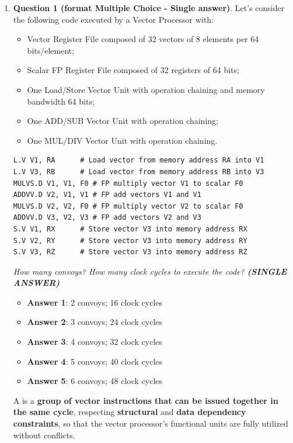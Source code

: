 \begin{enumerate}
    \item \textbf{Question 1 (format Multiple Choice - Single answer)}. Let's consider the following code executed by a Vector Processor with:
    \begin{itemize}
        \item Vector Register File composed of 32 vectors of 8 elements per 64 bits/element;
        \item Scalar FP Register File composed of 32 registers of 64 bits;
        \item One Load/Store Vector Unit with operation chaining and memory bandwidth 64 bits;
        \item One ADD/SUB Vector Unit with operation chaining;
        \item One MUL/DIV Vector Unit with operation chaining.
    \end{itemize}
    \begin{lstlisting}[language=unknown]
L.V V1, RA      # Load vector from memory address RA into V1
L.V V3, RB      # Load vector from memory address RB into V3
MULVS.D V1, V1, F0 # FP multiply vector V1 to scalar F0
ADDVV.D V2, V1, V1 # FP add vectors V1 and V1
MULVS.D V2, V2, F0 # FP multiply vector V2 to scalar F0
ADDVV.D V3, V2, V3 # FP add vectors V2 and V3
S.V V1, RX      # Store vector V3 into memory address RX
S.V V2, RY      # Store vector V3 into memory address RY
S.V V3, RZ      # Store vector V3 into memory address RZ\end{lstlisting}
    \emph{How many convoys? How many clock cycles to execute the code? \textbf{(SINGLE ANSWER)}}
    \begin{itemize}[label=\textcolor{Red2}{}]
        \item \textbf{Answer 1}: 2 convoys; 16 clock cycles
        \item \textbf{Answer 2}: 3 convoys; 24 clock cycles
        \item \textbf{Answer 3}: 4 convoys; 32 clock cycles
        \item[\textcolor{Green3}{\faIcon{check}}] \textbf{Answer 4}: 5 convoys; 40 clock cycles
        \item \textbf{Answer 5}: 6 convoys; 48 clock cycles
    \end{itemize}
    A  is a \textbf{group of vector instructions that can be issued together in the same cycle}, respecting \textbf{structural} and \textbf{data dependency constraints}, so that the vector processor's functional units are fully utilized without conflicts.

\end{enumerate}
